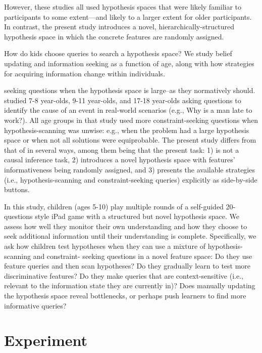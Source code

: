 \documentclass[10pt,letterpaper]{article}
\begin{document}
However, these studies all used hypothesis spaces that were likely familiar to 
participants to some extent---and likely to a larger extent for older participants. 
In contrast, the present study introduces a novel, hierarchically-structured 
hypothesis space in which the concrete features are randomly assigned. 


How do kids choose queries to search a hypothesis space? We study belief 
updating and information seeking as a function of age, along with how strategies for 
acquiring information change within individuals.

seeking questions when the hypothesis space is large--as they normatively should. 
  studied 7-8 year-olds, 9-11 year-olds, and 17-18 year-olds 
asking questions to identify the cause of an event in real-world scenarios (e.g., Why 
is a man late to work?). All age groups in that study used more constraint-seeking 
questions when hypothesis-scanning was unwise: e.g., when the problem had a 
large hypothesis space or when not all solutions were equiprobable. The present 
study differs from that of  in several ways, among them being 
that the present task: 1) is not a causal inference task, 2) introduces a novel 
hypothesis space with features' informativeness being randomly assigned, and 3) 
presents the available strategies (i.e., hypothesis-scanning and constraint-seeking 
queries) explicitly as side-by-side buttons.

In this study, children (ages 5-10) play multiple rounds of a self-guided 20-questions 
style iPad game with a structured but novel hypothesis space. We assess how well 
they monitor their own understanding and how they choose to seek additional 
information until their understanding is complete. Specifically, we ask how children 
test hypotheses when they can use a mixture of hypothesis-scanning and constraint-
seeking questions in a novel feature space: Do they use feature queries and then 
scan hypotheses? Do they gradually learn to test more discriminative features? Do 
they make queries that are context-sensitive (i.e., relevant to the information state 
they are currently in)? Does manually updating the hypothesis space reveal 
bottlenecks, or perhaps push learners to find more informative queries?


\section{Experiment}
\end{document}

